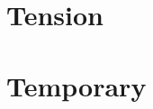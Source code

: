 \documentclass[10pt]{report}
\begin{document}



\part{Tension}
\label{part:tension}







\appendix


% 

\part{Temporary}





\printbibliography


% 
\end{document}
